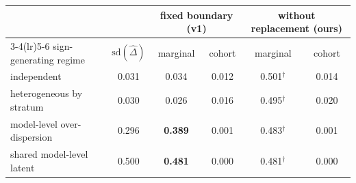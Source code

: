 \begin{tabular}{lccccc}
\toprule
& & \multicolumn{2}{c}{fixed boundary (v1)} & \multicolumn{2}{c}{without replacement (ours)}\\
\cmidrule(lr){3-4}\cmidrule(lr){5-6}
sign-generating regime & $\mathrm{sd}(\hat\Delta)$ & marginal & cohort & marginal & cohort\\
\midrule
independent & 0.031 & 0.034 & 0.012 & 0.501$^{\dagger}$ & 0.014\\
heterogeneous by stratum & 0.030 & 0.026 & 0.016 & 0.495$^{\dagger}$ & 0.020\\
model-level over-dispersion & 0.296 & \textbf{0.389} & 0.001 & 0.483$^{\dagger}$ & 0.001\\
shared model-level latent & 0.500 & \textbf{0.481} & 0.000 & 0.481$^{\dagger}$ & 0.000\\
\bottomrule
\end{tabular}
